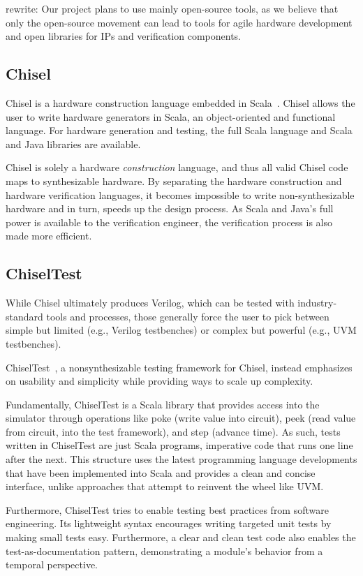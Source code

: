 \documentclass[conference]{IEEEtran}
\newcommand{\rewrite}[1]{{\color{red} rewrite: #1}}
\begin{document}
\rewrite{Our project plans to use mainly open-source tools, as we believe that only the open-source
movement can lead to tools for agile hardware development and open libraries for IPs
and verification components.

\subsection{Chisel}

Chisel is a hardware construction language embedded in Scala~\cite{chisel:dac2012}.
Chisel allows the user to write hardware generators in Scala, an object-oriented and functional language. For hardware generation and testing, the full Scala language and Scala and Java
libraries are available.

Chisel is solely a hardware \emph{construction} language, and thus all valid Chisel code
maps to synthesizable hardware.
By separating the hardware construction and hardware verification languages,
it becomes impossible to write non-synthesizable hardware and in turn, speeds up the design process.
As Scala and Java's full power is available to the verification engineer,
the verification process is also made more efficient.

\subsection{ChiselTest}

While Chisel ultimately produces Verilog, which can be tested with industry-standard tools and processes, those generally force the user to pick between simple but limited (e.g., Verilog testbenches) or complex but powerful (e.g., UVM testbenches).

ChiselTest~\cite{chisel:tester2}, a nonsynthesizable testing framework for Chisel, instead emphasizes on usability and simplicity while providing ways to scale up complexity.

Fundamentally, ChiselTest is a Scala library that provides access into the simulator through operations like poke (write value into circuit), peek (read value from circuit, into the test framework), and step (advance time).
As such, tests written in ChiselTest are just Scala programs, imperative code that runs one line after the next.
This structure uses the latest programming language developments that have been implemented into Scala and provides a clean and concise interface, unlike approaches that attempt to reinvent the wheel like UVM.

Furthermore, ChiselTest tries to enable testing best practices from software engineering.
Its lightweight syntax encourages writing targeted unit tests by making small tests easy.
Furthermore, a clear and clean test code also enables the test-as-documentation pattern,
demonstrating a module's behavior from a temporal perspective.}
\end{document}
